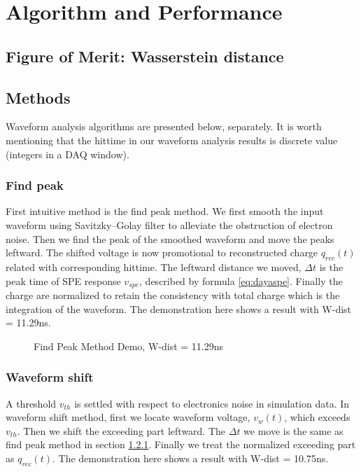 \section{Algorithm and Performance} %
\label{sec:algorithm}

\subsection{Figure of Merit: Wasserstein distance}



\subsection{Methods}

Waveform analysis algorithms are presented below, separately. It is worth mentioning that the hittime in our waveform analysis results is discrete value (integers in a DAQ window). 

\subsubsection{Find peak}
\label{sec:findpeak}

First intuitive method is the find peak method. We first smooth the input waveform using Savitzky–Golay filter to alleviate the obstruction of electron noise. Then we find the peak of the smoothed waveform and move the peaks leftward. The shifted voltage is now promotional to reconstructed charge $q_{rec}(t)$ related with corresponding hittime. The leftward distance we moved, $\Delta t$ is the peak time of SPE response $v_{spe}$, described by formula \eqref{eq:dayaspe}. Finally the charge are normalized to retain the consistency with total charge which is the integration of the waveform. The demonstration here shows a result with W-dist = 11.29ns. 

\begin{figure}[H]
    \centering
    \scalebox{0.4}{}
    \caption{Find Peak Method Demo, W-dist = 11.29ns}
\end{figure}

\subsubsection{Waveform shift}

A threshold $v_{th}$ is settled with respect to electronics noise in simulation data. In waveform shift method, first we locate waveform voltage, $v_{w}(t)$, which exceeds $v_{th}$. Then we shift the exceeding part leftward. The $\Delta t$ we move is the same as find peak method in section \ref{sec:findpeak}. Finally we treat the normalized exceeding part as $q_{rec}(t)$. The demonstration here shows a result with W-dist = 10.75ns. 

